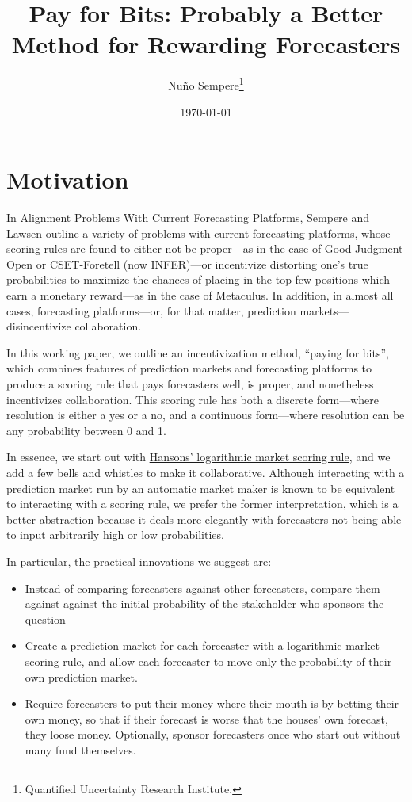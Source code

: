 \documentclass[]{article}
\title{Pay for Bits: Probably a Better Method for Rewarding Forecasters}
\author{Nuño Sempere\footnote{Quantified Uncertainty Research Institute.}}
\date{\today}
\providecommand{\tightlist}{%
  \setlength{\itemsep}{0pt}\setlength{\parskip}{0pt}}
\begin{document}
\maketitle

\hypertarget{motivation}{%
\section{Motivation}\label{motivation}}

In \href{https://arxiv.org/abs/2106.11248}{Alignment Problems With
Current Forecasting Platforms}, Sempere and Lawsen outline a variety of
problems with current forecasting platforms, whose scoring rules are
found to either not be proper---as in the case of Good Judgment Open or
CSET-Foretell (now INFER)---or incentivize distorting one's true
probabilities to maximize the chances of placing in the top few
positions which earn a monetary reward---as in the case of Metaculus. In
addition, in almost all cases, forecasting platforms---or, for that
matter, prediction markets---disincentivize collaboration.

In this working paper, we outline an incentivization method, ``paying
for bits'', which combines features of prediction markets and
forecasting platforms to produce a scoring rule that pays forecasters
well, is proper, and nonetheless incentivizes collaboration. This
scoring rule has both a discrete form---where resolution is either a yes
or a no, and a continuous form---where resolution can be any probability
between 0 and 1.

In essence, we start out with
\href{https://mason.gmu.edu/~rhanson/mktscore.pdf}{Hansons' logarithmic
market scoring rule}, and we add a few bells and whistles to make it
collaborative. Although interacting with a prediction market run by an
automatic market maker is known to be equivalent to interacting with a
scoring rule, we prefer the former interpretation, which is a better
abstraction because it deals more elegantly with forecasters not being
able to input arbitrarily high or low probabilities.

In particular, the practical innovations we suggest are:

\begin{itemize}
\tightlist
\item
  Instead of comparing forecasters against other forecasters, compare
  them against against the initial probability of the stakeholder who
  sponsors the question
\item
  Create a prediction market for each forecaster with a logarithmic
  market scoring rule, and allow each forecaster to move only the
  probability of their own prediction market.
\item
  Require forecasters to put their money where their mouth is by betting
  their own money, so that if their forecast is worse that the houses'
  own forecast, they loose money. Optionally, sponsor forecasters once
  who start out without many fund themselves.
\end{itemize}
\end{document}
